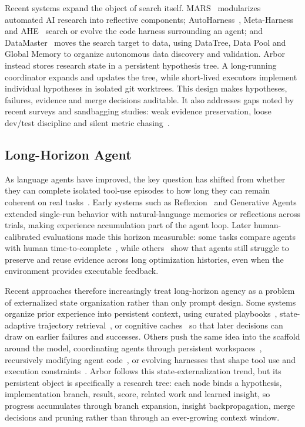 \documentclass{llmxive}
\begin{document}
Recent systems expand the object of search itself. MARS~\citep{mars} modularizes automated AI research into reflective components; AutoHarness~\citep{autoharness}, Meta-Harness~\citep{metaharness} and AHE~\citep{ahe} search or evolve the code harness surrounding an agent; and DataMaster~\citep{datamaster} moves the search target to data, using DataTree, Data Pool and Global Memory to organize autonomous data discovery and validation. Arbor instead stores research state in a persistent hypothesis tree. A long-running coordinator expands and updates the tree, while short-lived executors implement individual hypotheses in isolated git worktrees. This design makes hypotheses, failures, evidence and merge decisions auditable. It also addresses gaps noted by recent surveys and sandbagging studies: weak evidence preservation, loose dev/test discipline and silent metric chasing~\citep{aiscientistsurvey,gasteiger2025automated}.

\subsection{Long-Horizon Agent}
As language agents have improved, the key question has shifted from whether they can complete isolated tool-use episodes to how long they can remain coherent on real tasks~\citep{longcontextsurvey,longhorizonexecution,agentfugue}. Early systems such as Reflexion~\citep{reflexion} and Generative Agents~\citep{generativeagent} extended single-run behavior with natural-language memories or reflections across trials, making experience accumulation part of the agent loop. Later human-calibrated evaluations made this horizon measurable: some tasks compare agents with human time-to-complete~\citep{rebench,hcast,metr}, while others~\citep{nanogptspeedrunning,posttrainbench} show that agents still struggle to preserve and reuse evidence across long optimization histories, even when the environment provides executable feedback.

Recent approaches therefore increasingly treat long-horizon agency as a problem of externalized state organization rather than only prompt design. Some systems organize prior experience into persistent context, using curated playbooks~\citep{ace}, state-adaptive trajectory retrieval~\citep{sam}, or cognitive caches~\citep{mlmaster2} so that later decisions can draw on earlier failures and successes. Others push the same idea into the scaffold around the model, coordinating agents through persistent workspaces~\citep{aiscientist_long}, recursively modifying agent code~\citep{darwinmachine}, or evolving harnesses that shape tool use and execution constraints~\citep{autoharness}. Arbor follows this state-externalization trend, but its persistent object is specifically a research tree: each node binds a hypothesis, implementation branch, result, score, related work and learned insight, so progress accumulates through branch expansion, insight backpropagation, merge decisions and pruning rather than through an ever-growing context window.
\end{document}
